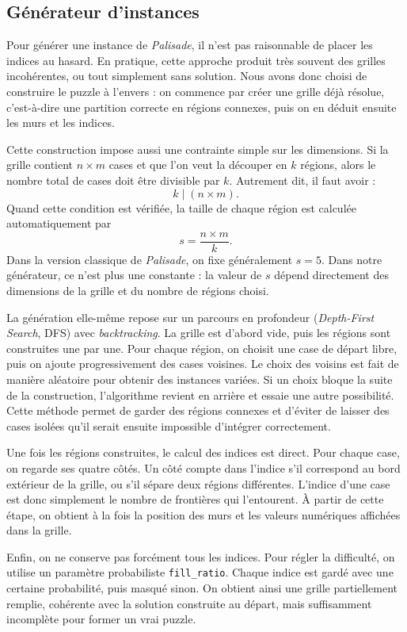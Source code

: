 \subsection{Générateur d'instances}

Pour générer une instance de \textit{Palisade}, il n'est pas raisonnable de placer les indices au hasard. En pratique, cette approche produit très souvent des grilles incohérentes, ou tout simplement sans solution. Nous avons donc choisi de construire le puzzle à l'envers : on commence par créer une grille déjà résolue, c'est-à-dire une partition correcte en régions connexes, puis on en déduit ensuite les murs et les indices.

Cette construction impose aussi une contrainte simple sur les dimensions. Si la grille contient \(n \times m\) cases et que l'on veut la découper en \(k\) régions, alors le nombre total de cases doit être divisible par \(k\). Autrement dit, il faut avoir :
\[
k \mid (n \times m).
\]
Quand cette condition est vérifiée, la taille de chaque région est calculée automatiquement par
\[
s = \frac{n \times m}{k}.
\]
Dans la version classique de \textit{Palisade}, on fixe généralement \(s = 5\). Dans notre générateur, ce n'est plus une constante : la valeur de \(s\) dépend directement des dimensions de la grille et du nombre de régions choisi.

La génération elle-même repose sur un parcours en profondeur (\textit{Depth-First Search}, DFS) avec \textit{backtracking}. La grille est d'abord vide, puis les régions sont construites une par une. Pour chaque région, on choisit une case de départ libre, puis on ajoute progressivement des cases voisines. Le choix des voisins est fait de manière aléatoire pour obtenir des instances variées. Si un choix bloque la suite de la construction, l'algorithme revient en arrière et essaie une autre possibilité. Cette méthode permet de garder des régions connexes et d'éviter de laisser des cases isolées qu'il serait ensuite impossible d'intégrer correctement.

Une fois les régions construites, le calcul des indices est direct. Pour chaque case, on regarde ses quatre côtés. Un côté compte dans l'indice s'il correspond au bord extérieur de la grille, ou s'il sépare deux régions différentes. L'indice d'une case est donc simplement le nombre de frontières qui l'entourent. À partir de cette étape, on obtient à la fois la position des murs et les valeurs numériques affichées dans la grille.

Enfin, on ne conserve pas forcément tous les indices. Pour régler la difficulté, on utilise un paramètre probabiliste \texttt{fill\_ratio}. Chaque indice est gardé avec une certaine probabilité, puis masqué sinon. On obtient ainsi une grille partiellement remplie, cohérente avec la solution construite au départ, mais suffisamment incomplète pour former un vrai puzzle.

